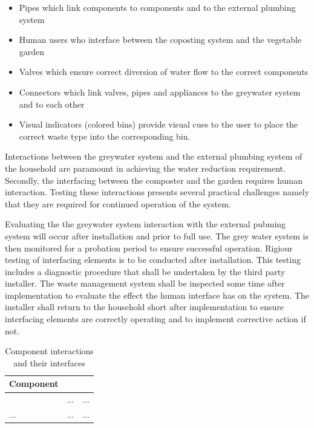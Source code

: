 \documentclass[a4paper,11pt,fleqn]{report}
\begin{document}
\begin{itemize}
\item Pipes which link components to components and to the external plumbing system
\item Human users who interface between the coposting system and the vegetable garden
\item Valves which ensure correct diversion of water flow to the correct components
\item Connectors which link valves, pipes and appliances to the greywater system and to each other
\item Visual indicators (colored bins) provide visual cues to the user to place the correct waste type into the corresponding bin.
\end{itemize}

Interactions between the greywater system and the external plumbing system of the household are paramount in achieving the water reduction requirement. Secondly, the interfacing between the composter and the garden requires human interaction. Testing these interactions presents several practical challenges namely that they are required for continued operation of the system. 

Evaluating the the greywater system interaction with the external pubming system will occur after installation and prior to full use. The grey water system is then monitored for a probation period to ensure successful operation. Rigiour testing of interfacing elements is to be conducted after installation. This testing includes a diagnostic procedure that shall be undertaken by the third party installer. The waste management system shall be inspected some time after implementation to evaluate the effect the human interface has on the system. The installer shall return to the household short after implementation to ensure interfacing elements are correctly operating and to implement corrective action if not.

\begin{table}[h!]
\caption {Component interactions and their interfaces} \label{tb: Components & interfaces} 
\begin{center}
\begin{tabular}{p{4cm}|p{4cm}|p{4cm}}\toprule
	{\textbf{Component}} & {\textbf{Interaction} & {\textbf{Interface}\\ \midrule
    \textcolor{Format used by sample project} & ... & ...\\
    \hline
    ... & ... & ...\\

    \bottomrule
\end{tabular}
\end{center}
\end{table}
\end{document}
